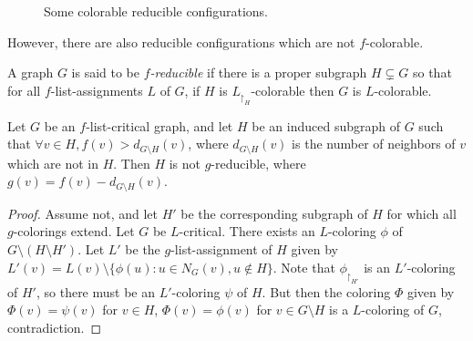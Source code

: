 \begin{figure}

\centering
\begin{subfigure}{0.4\textwidth}

\begin{tikzpicture}


\end{tikzpicture}

\end{subfigure}
\begin{subfigure}{0.4\textwidth}

\begin{tikzpicture}


\end{tikzpicture}

\end{subfigure}
\caption{Some colorable reducible configurations.}
\label{fig:colorablereducible}
\end{figure}

However, there are also reducible configurations which are not $f$-colorable.

\begin{definition}
A graph $G$ is said to be \emph{$f$-reducible} if there is a proper subgraph $H \subsetneq G$ so that
for all $f$-list-assignments $L$ of $G$, if $H$ is $L_{\restriction_H}$-colorable then $G$ is $L$-colorable. 
\end{definition}

\begin{proposition}
Let $G$ be an $f$-list-critical graph, and let $H$ be an induced subgraph of $G$ such that $\forall v \in H, f(v) > d_{G\setminus H}(v)$,
where $d_{G \setminus H}(v)$ is the number of neighbors of $v$ which are not in $H$. Then $H$ is not $g$-reducible, where $g(v) = f(v) -d_{G\setminus H}(v)$.
\end{proposition}

\begin{proof}
Assume not, and let $H'$ be the corresponding subgraph of $H$ for which all $g$-colorings extend. Let $G$ be $L$-critical. 
There exists an $L$-coloring $\phi$ of $G \setminus (H \setminus H')$. Let $L'$ be the $g$-list-assignment of $H$ given by 
$L'(v) = L(v) \setminus \{\phi(u) : u \in N_G(v), u \not\in H\}$. Note that $\phi_{\restriction_{H'}}$ is an $L'$-coloring of $H'$, so there must
be an $L'$-coloring $\psi$ of $H$. But then the coloring $\Phi$ given by $\Phi(v) = \psi(v)$ for $v \in H$, $\Phi(v) = \phi(v)$ for $v \in G \setminus H$ is 
a $L$-coloring of $G$, contradiction. 
\end{proof}


